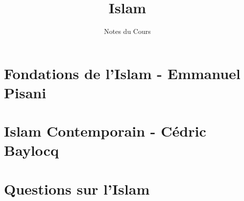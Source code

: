 \documentclass[oneside,10pt]{book} %
\title{Islam}
\author{Notes du Cours}
\begin{document}


\maketitle



\setcounter{page}{1}
\begin{fullwidth}
\tableofcontents
\end{fullwidth}

\setcounter{page}{1}

\mainmatter

%
\part{Fondations de l'Islam - Emmanuel Pisani}

\FloatBarrier






\part{Islam Contemporain - Cédric Baylocq}


\part{Questions sur l'Islam}





\backmatter

%
%
\printbibliography

\listoftheorems[ignoreall,show={Def}]

\listoftheorems
\end{document}
